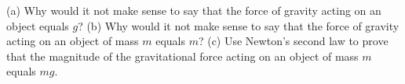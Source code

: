 (a) Why would it not make sense to say that the force of gravity
acting on an object equals $g$?\hwendpart
(b) Why would it not make sense to say that the force of gravity
acting on an object of mass $m$ equals $m$?\hwendpart
(c) Use Newton's second law to prove that the magnitude of the gravitational force acting
on an object of mass $m$ equals $mg$.
